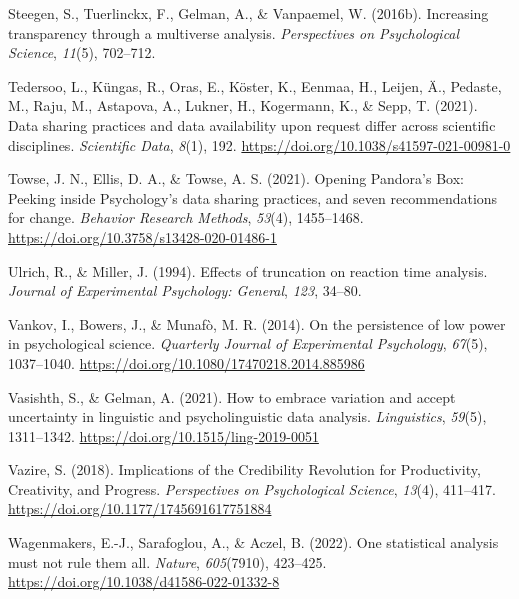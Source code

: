 \documentclass[
  letterpaper,
  DIV=11,
  numbers=noendperiod]{scrreprt}
\newlength{\cslhangindent}
\newlength{\cslentryspacingunit} %
\newenvironment{CSLReferences}[2] %
 {%
  \setlength{\parindent}{0pt}
  \ifodd #1
  \let\oldpar\par
  \def\par{\hangindent=\cslhangindent\oldpar}
  \fi
  \setlength{\parskip}{#2\cslentryspacingunit}
 }%
 {}
\begin{document}
\begin{CSLReferences}{1}{0}
\leavevmode{}%
Steegen, S., Tuerlinckx, F., Gelman, A., \& Vanpaemel, W. (2016b).
Increasing transparency through a multiverse analysis.
\emph{Perspectives on Psychological Science}, \emph{11}(5), 702--712.

\leavevmode{}%
Tedersoo, L., Küngas, R., Oras, E., Köster, K., Eenmaa, H., Leijen, Ä.,
Pedaste, M., Raju, M., Astapova, A., Lukner, H., Kogermann, K., \& Sepp,
T. (2021). Data sharing practices and data availability upon request
differ across scientific disciplines. \emph{Scientific Data},
\emph{8}(1), 192. \url{https://doi.org/10.1038/s41597-021-00981-0}

\leavevmode{}%
Towse, J. N., Ellis, D. A., \& Towse, A. S. (2021). Opening Pandora's
Box: Peeking inside Psychology's data sharing practices, and seven
recommendations for change. \emph{Behavior Research Methods},
\emph{53}(4), 1455--1468.
\url{https://doi.org/10.3758/s13428-020-01486-1}

\leavevmode{}%
Ulrich, R., \& Miller, J. (1994). Effects of truncation on reaction time
analysis. \emph{Journal of Experimental Psychology: General},
\emph{123}, 34--80.

\leavevmode{}%
Vankov, I., Bowers, J., \& Munafò, M. R. (2014). On the persistence of
low power in psychological science. \emph{Quarterly Journal of
Experimental Psychology}, \emph{67}(5), 1037--1040.
\url{https://doi.org/10.1080/17470218.2014.885986}

\leavevmode{}%
Vasishth, S., \& Gelman, A. (2021). How to embrace variation and accept
uncertainty in linguistic and psycholinguistic data analysis.
\emph{Linguistics}, \emph{59}(5), 1311--1342.
\url{https://doi.org/10.1515/ling-2019-0051}

\leavevmode{}%
Vazire, S. (2018). Implications of the Credibility Revolution for
Productivity, Creativity, and Progress. \emph{Perspectives on
Psychological Science}, \emph{13}(4), 411--417.
\url{https://doi.org/10.1177/1745691617751884}

\leavevmode{}%
Wagenmakers, E.-J., Sarafoglou, A., \& Aczel, B. (2022). One statistical
analysis must not rule them all. \emph{Nature}, \emph{605}(7910),
423--425. \url{https://doi.org/10.1038/d41586-022-01332-8}


\end{CSLReferences}
\end{document}
